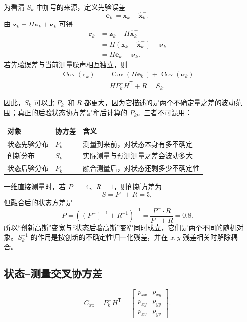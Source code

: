 \documentclass[UTF8,a4paper,11pt]{ctexart}
\newcommand{\prior}{^{-}}
\newcommand{\transpose}{^{\mathsf T}}
\begin{document}
为看清 $S_k$ 中加号的来源，定义先验误差
\begin{equation}
\bm e_k\prior=\bm x_k-\hat{\bm x}_k\prior.
\end{equation}
由 $\bm z_k=H\bm x_k+\bm\nu_k$ 可得
\begin{align}
\bm r_k
&=\bm z_k-H\hat{\bm x}_k\prior\\
&=H(\bm x_k-\hat{\bm x}_k\prior)+\bm\nu_k\\
&=H\bm e_k\prior+\bm\nu_k.
\end{align}
若先验误差与当前测量噪声相互独立，则
\begin{align}
\operatorname{Cov}(\bm r_k)
&=\operatorname{Cov}(H\bm e_k\prior)+\operatorname{Cov}(\bm\nu_k)\\
&=HP_k\prior H\transpose+R=S_k.
\end{align}

因此，$S_k$ 可以比 $P_k\prior$ 和 $R$ 都更大，因为它描述的是两个不确定量之差的波动范围；真正的后验状态协方差是稍后计算的 $P_k$。三者不可混用：
\begin{center}
\begin{tabularx}{0.94\textwidth}{>{\centering\arraybackslash}p{30mm}>{\centering\arraybackslash}p{25mm}X}
\toprule
对象 & 协方差 & 含义\\
\midrule
状态先验分布 & $P_k\prior$ & 测量到来前，对状态本身有多不确定\\
创新分布 & $S_k$ & 实际测量与预测测量之差会波动多大\\
状态后验分布 & $P_k$ & 融合测量后，对状态还剩多少不确定性\\
\bottomrule
\end{tabularx}
\end{center}

一维直接测量时，若 $P\prior=4$、$R=1$，则创新方差为
\begin{equation}
S=P\prior+R=5,
\end{equation}
但融合后的状态方差是
\begin{equation}
P=\left((P\prior)^{-1}+R^{-1}\right)^{-1}
=\frac{P\prior\!\cdot R}{P\prior+R}=0.8.
\end{equation}
所以“创新高斯”变宽与“状态后验高斯”变窄同时成立，它们是两个不同的随机对象。$S_k^{-1}$ 的作用是按创新的不确定性归一化残差，并在 $x,y$ 残差相关时解除耦合。

\subsection{状态--测量交叉协方差}

\begin{equation}
C_{xz}=P_k\prior H\transpose
=
\begin{bmatrix}
p_{xx}&p_{xy}\\
p_{xy}&p_{yy}\\
p_{xv}&p_{yv}
\end{bmatrix}.
\label{eq:cross-covariance}
\end{equation}
\end{document}
